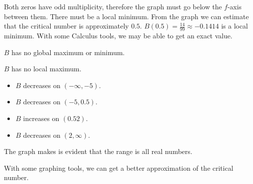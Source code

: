 \documentclass{ximera}
\begin{document}
\begin{example}
\begin{image}
\end{image}


Both zeros have odd multiplicity, therefore the graph must go below the $f$-axis between them.  There must be a local minimum. From the graph we can estimate that the critical number is approximately $0.5$. $B(0.5) = \frac{14}{99} \approx -0.1414$ is a local minimum. With some Calculus tools, we may be able to get an exact value.


$B$ has no global maximum or minimum.

$B$ has no local maximum.


\begin{itemize}
\item $B$ decreases on $(-\infty, -5)$.
\item $B$ decreases on $(-5, 0.5)$.
\item $B$ increases on $(0.5 2)$.
\item $B$ decreases on $(2, \infty)$.
\end{itemize}



The graph makes is evident that the range is all real numbers.


\end{example}








With some graphing tools, we can get a better approximation of the critical number.
\end{document}
